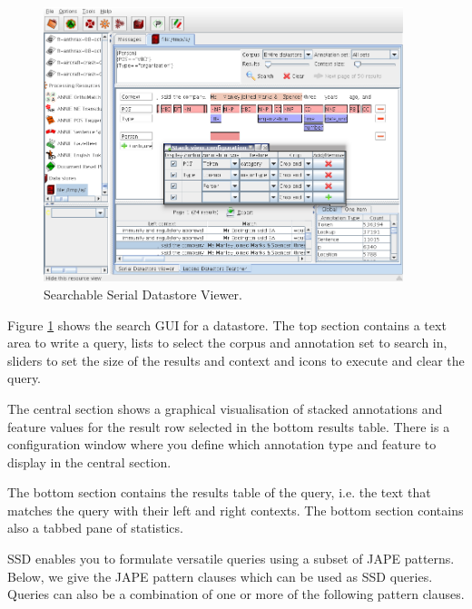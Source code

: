 
\begin{figure}
\begin{center}
\includegraphics[height=8cm]{ssd.png}
\caption{Searchable Serial Datastore Viewer.}
\label{fig:annicmain}
\end{center}
\end{figure}


Figure \ref{fig:annicmain} shows the search GUI for a datastore. The top
section contains a text area to write a query, lists to select the corpus
and annotation set to search in, sliders to set the size of the results and
context and icons to execute and clear the query.

The central section shows a graphical visualisation of stacked annotations
and feature values for the result row selected in the bottom results
table. There is a configuration window where you define which annotation
type and feature to display in the central section.

The bottom section contains the results table of the query, i.e. the text
that matches the query with their left and right contexts. The bottom
section contains also a tabbed pane of statistics.


SSD enables you to formulate versatile queries using a subset of JAPE
patterns. Below, we give the JAPE pattern clauses which can be used as SSD
queries. Queries can also be a combination of one or more of the following
pattern clauses.

